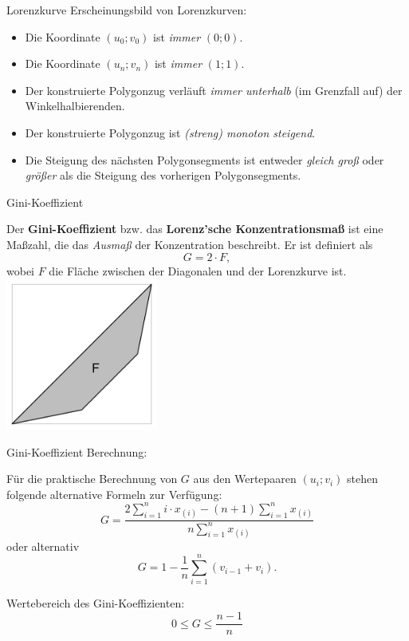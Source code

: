 \documentclass[
  10pt,
  ignorenonframetext,
]{beamer}
\providecommand{\tightlist}{%
  \setlength{\itemsep}{0pt}\setlength{\parskip}{0pt}}
\begin{document}
\begin{frame}{Lorenzkurve}
\label{lorenzkurve-5}
Erscheinungsbild von Lorenzkurven:

\begin{itemize}
\tightlist
\item
  Die Koordinate \((u_{0}; v_{0})\) ist \textit{immer} \((0; 0)\).
\item
  Die Koordinate \((u_{n}; v_{n})\) ist \textit{immer} \((1; 1)\).
\item
  Der konstruierte Polygonzug verläuft \textit{immer unterhalb} (im
  Grenzfall auf) der Winkelhalbierenden.
\item
  Der konstruierte Polygonzug ist \textit{(streng) monoton steigend}.
\item
  Die Steigung des nächsten Polygonsegments ist entweder
  \textit{gleich groß} oder \textit{größer} als die Steigung des
  vorherigen Polygonsegments.
\end{itemize}
\end{frame}

\begin{frame}{Gini-Koeffizient}
\label{gini-koeffizient}
\columnsbegin
\column{5cm}

Der \textbf{Gini-Koeffizient} bzw. das \textbf{Lorenz'sche
Konzentrationsmaß} ist eine Maßzahl, die das \textit{Ausmaß} der
Konzentration beschreibt. Er ist definiert als \[
G = 2 \cdot F,
\] wobei \(F\) die Fläche zwischen der Diagonalen und der Lorenzkurve
ist. \column{5cm} \includegraphics[width = 5cm]{pics/2-gini.pdf}
\columnsend
\end{frame}

\begin{frame}{Gini-Koeffizient}
\label{gini-koeffizient-1}
Berechnung:

Für die praktische Berechnung von \(G\) aus den Wertepaaren
\((u_{i}; v_{i})\) stehen folgende alternative Formeln zur Verfügung: \[
      G = \frac{2 \sum_{i=1}^{n}i \cdot x_{(i)} - (n + 1) \sum_{i=1}^{n}x_{(i)}}{n \sum_{i=1}^{n}x_{(i)}}
\] oder alternativ \[
      G = 1 - \frac{1}{n} \sum_{i=1}^{n}(v_{i-1} + v_{i}).
\]

Wertebereich des Gini-Koeffizienten:\\
\[
      0 \leq G \leq \frac{n - 1}{n}
  \]
\end{frame}
\end{document}
